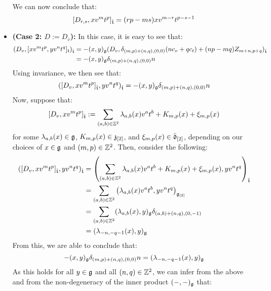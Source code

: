 \begin{remark}
\begin{itemize}
                    We can now conclude that:
                        $$[D_{r, s}, x v^m t^p]_{\hat{\mathfrak{t}}} = ( rp - ms ) x v^{m - r} t^{p - s - 1}$$
                    \item \textbf{(Case 2: $D := D_v$):} In this case, it is easy to see that:
                        $$
                            \begin{aligned}
                                ( D_v, [x v^m t^p, y v^n t^q]_{\mathfrak{t}} )_{\hat{\mathfrak{t}}} & = -(x, y)_{\mathfrak{g}} ( D_v, \delta_{(m, p) + (n, q), (0, 0)} ( n c_v + q c_t ) + (np - mq) Z_{m + n, p + q} )_{\hat{\mathfrak{t}}}
                                \\
                                & = -(x, y)_{\mathfrak{g}} \delta_{(m, p) + (n, q), (0, 0)} n
                            \end{aligned}
                        $$
                    Using invariance, we then see that:
                        $$( [D_v, x v^m t^p]_{\hat{\mathfrak{t}}}, y v^n t^q )_{\hat{\mathfrak{t}}} = -(x, y)_{\mathfrak{g}} \delta_{(m, p) + (n, q), (0, 0)} n$$
                    Now, suppose that:
                        $$[D_v, x v^m t^p]_{\hat{\mathfrak{t}}} := \sum_{(a, b) \in \mathbb{Z}^2} \lambda_{a, b}(x) v^a t^b + K_{m, p}(x) + \xi_{m, p}(x)$$
                    for some $\lambda_{a, b}(x) \in \mathfrak{g}$, $K_{m, p}(x) \in \mathfrak{z}_{[2]}$, and $\xi_{m, p}(x) \in \bar{\mathfrak{d}}_{[2]}$, depending on our choices of $x \in \mathfrak{g}$ and $(m, p) \in \mathbb{Z}^2$. Then, consider the following:
                        $$
                            \begin{aligned}
                                ( [D_v, x v^m t^p]_{\hat{\mathfrak{t}}}, y v^n t^q )_{\hat{\mathfrak{t}}} & = \left( \sum_{(a, b) \in \mathbb{Z}^2} \lambda_{a, b}(x) v^a t^b + K_{m, p}(x) + \xi_{m, p}(x), y v^n t^q \right)_{\hat{\mathfrak{t}}}
                                \\
                                & = \sum_{(a, b) \in \mathbb{Z}^2} \left( \lambda_{a, b}(x) v^a t^b, y v^n t^q \right)_{\mathfrak{g}_{[2]}}
                                \\
                                & = \sum_{(a, b) \in \mathbb{Z}^2} (\lambda_{a, b}(x), y)_{\mathfrak{g}} \delta_{ (a, b) + (n, q), (0, -1) }
                                \\
                                & = (\lambda_{-n, -q - 1}(x), y)_{\mathfrak{g}}
                            \end{aligned}
                        $$
                    From this, we are able to conclude that:
                        $$-(x, y)_{\mathfrak{g}} \delta_{(m, p) + (n, q), (0, 0)} n = (\lambda_{-n, -q - 1}(x), y)_{\mathfrak{g}}$$
                    As this holds for all $y \in \mathfrak{g}$ and all $(n, q) \in \mathbb{Z}^2$, we can infer from the above and from the non-degeneracy of the inner product $(-, -)_{\mathfrak{g}}$ that:

\end{itemize}
\end{remark}
